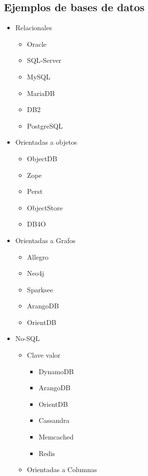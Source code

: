 \subsection{Ejemplos de bases de datos}

\begin{itemize}
    \item Relacionales
    \begin{itemize}
        \item Oracle
        \item SQL-Server
        \item MySQL
        \item MariaDB
        \item DB2
        \item PostgreSQL
    \end{itemize}
    \item Orientadas a objetos
    \begin{itemize}
        \item ObjectDB
        \item Zope
        \item Perst
        \item ObjectStore
        \item DB4O
    \end{itemize}
    \item Orientadas a Grafos
    \begin{itemize}
        \item Allegro
        \item Neo4j
        \item Sparksee
        \item ArangoDB
        \item OrientDB
    \end{itemize}
    \item No-SQL
        \begin{itemize}
            \item Clave valor
            \begin{itemize}
                \item DynamoDB
                \item ArangoDB
                \item OrientDB
                \item Cassandra
                \item Memcached
                \item Redis
            \end{itemize}
            \item Orientadas a Columnas

\end{itemize}
\end{itemize}
